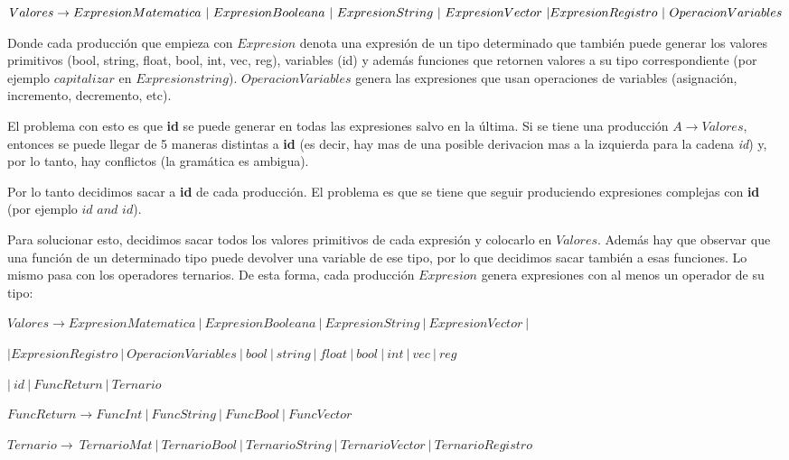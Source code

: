 $Valores \rightarrow ExpresionMatematica \  | \  ExpresionBooleana \  | \ ExpresionString  \ | \ ExpresionVector \ | \ \\ ExpresionRegistro \ | \ OperacionVariables $

Donde cada producción que empieza con $Expresion$ denota una expresión de un tipo determinado que también puede generar los valores primitivos (bool, string, float, bool, int, vec, reg), variables (id) y además funciones que retornen valores a su tipo correspondiente (por ejemplo $capitalizar$ en $Expresionstring$). $OperacionVariables$ genera las expresiones que usan operaciones de variables (asignación, incremento, decremento, etc). 

El problema con esto es que \textbf{id} se puede generar en todas las expresiones salvo en la última. Si se tiene una producción $A \rightarrow Valores$, entonces se puede llegar de 5 maneras distintas a \textbf{id} (es decir, hay mas de una posible derivacion mas a la izquierda para la cadena \textit{id}) y, por lo tanto, hay conflictos (la gramática es ambigua). 

Por lo tanto decidimos sacar a \textbf{id} de cada producción. El problema es que se tiene que seguir produciendo expresiones complejas con \textbf{id} (por ejemplo $id$ $and$ $id$).

Para solucionar esto, decidimos sacar todos los valores primitivos de cada expresión y colocarlo en $Valores$. Además hay que observar que una función de un determinado tipo puede devolver una variable de ese tipo, por lo que decidimos sacar también a esas funciones. Lo mismo pasa con los operadores ternarios. De esta forma, cada producción $Expresion$ genera expresiones con al menos un operador de su tipo:

$Valores \rightarrow ExpresionMatematica \ | \ ExpresionBooleana \  | \ ExpresionString \  | \ ExpresionVector \ | \  $

\hspace{15mm} $| ExpresionRegistro  \ | \ OperacionVariables \ | \ bool \ | \ string \ | \ float \ | \ bool \ | \ int \ | \ vec \ | \ reg  $

\hspace{15mm} $| \ id \ | \ FuncReturn \ | \ Ternario $

$FuncReturn \rightarrow FuncInt \ | \ FuncString \ | \ FuncBool \ | \ FuncVector $

$Ternario \rightarrow  \ TernarioMat \ | \ TernarioBool \ | \ TernarioString \ | \ TernarioVector \ | \ TernarioRegistro $



